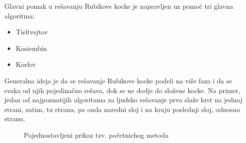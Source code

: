 \documentclass[a4paper]{article}
\begin{document}
Glavni pomak u rešavanju Rubikove kocke je napravljen uz pomoć tri glavna algoritma:

\begin{itemize}
\item Tisltvejtov
\item Kosiembin
\item Korfov
\end{itemize} 

 Generalna ideja je da se rešavanje Rubikove kocke podeli na više faza i da se svaka od njih pojedinačno rešava, dok se ne dodje do složene kocke.
Na primer, jedan od najpoznatijih algoritama za ljudsko rešavanje prvo slaže krst na jednoj strani, zatim, tu stranu, pa onda naredni sloj i na kraju poslednji sloj, odnosno stranu.

\begin{figure}[h!]
        \centering
        \caption{Pojednostavljeni prikaz tzv. početnichog metoda}
        \label{fig:beginners-method}
    \end{figure}
\end{document}
